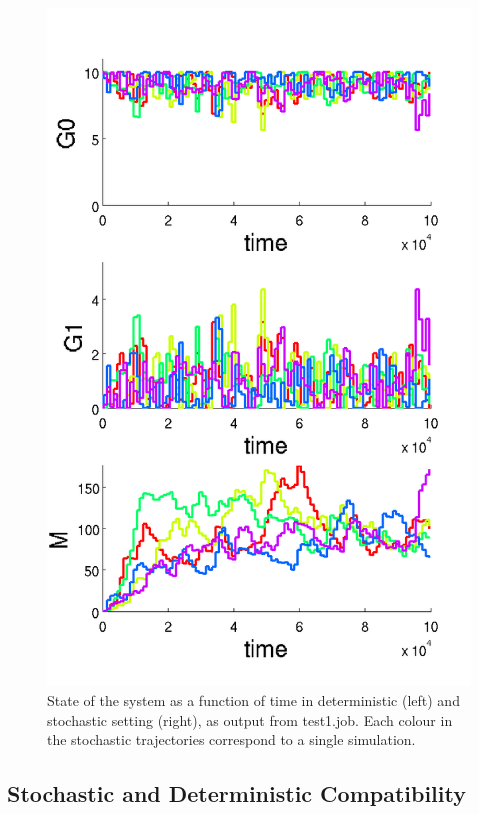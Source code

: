 \documentclass[letterpaper]{article}
\begin{document}
\begin{figure}[H]
\begin{minipage}[b]{0.48\linewidth}
    \includegraphics[scale=0.35]{figures/rna1_doc1_st.png}
  \end{minipage}
  \caption{State of the system as a function of time in deterministic
    (left) and stochastic setting (right), as output from
    \textsf{test1.job}. Each colour in the stochastic trajectories
    correspond to a single simulation.}
  \label{fig:test1serie}
\end{figure}

\subsection{Stochastic and Deterministic Compatibility}
\end{document}
